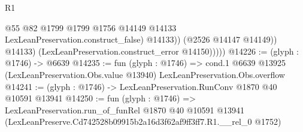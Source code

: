 \begin{lexlean}{R1}
\begin{coremodule}
                      @55
                      @82
                      @1799
                      @1799
                      @1756
                      @14149
                      @14133
                      LexLeanPreservation.construct_false)
                    @14133))
                (@2526 @14147 @14149))
              @14133)
            (LexLeanPreservation.construct_error @14150)))))
@14226 := (glyph : @1746) -> @6639
@14235 := fun (glyph : @1746) =>
  cond.{1} @6639 @13925 (LexLeanPreservation.Obs.value @13940) LexLeanPreservation.Obs.overflow
@14241 := (glyph : @1746) -> LexLeanPreservation.RunConv @1870 @40 @10591 @13941
@14250 := fun (glyph : @1746) =>
  LexLeanPreservation.run_of_funRel
    @1870
    @40
    @10591
    @13941
    (LexLeanPreserve.Cd742528b09915b2a16d3f62af9ff3ff7.R1.__rel_0 @1752)
\end{coremodule}
\end{lexlean}
